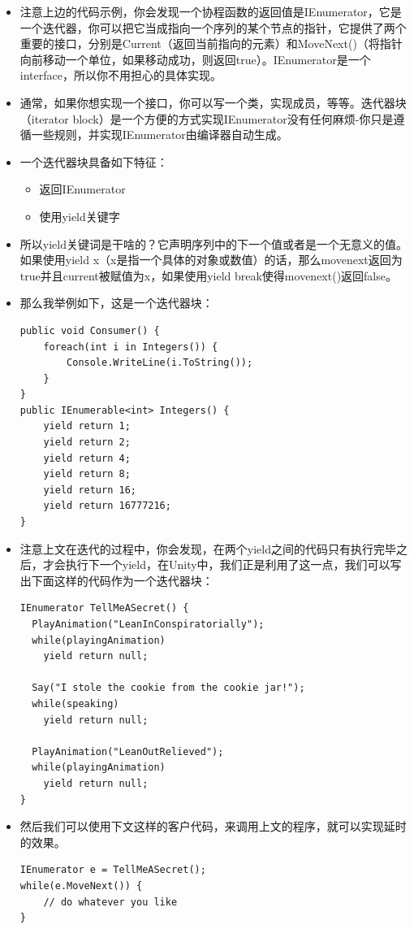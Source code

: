 \documentclass[9pt, b5paper]{article}
\begin{document}
\begin{itemize}
\item 注意上边的代码示例，你会发现一个协程函数的返回值是IEnumerator，它是一个迭代器，你可以把它当成指向一个序列的某个节点的指针，它提供了两个重要的接口，分别是Current（返回当前指向的元素）和MoveNext()（将指针向前移动一个单位，如果移动成功，则返回true）。IEnumerator是一个interface，所以你不用担心的具体实现。
\item 通常，如果你想实现一个接口，你可以写一个类，实现成员，等等。迭代器块（iterator block）是一个方便的方式实现IEnumerator没有任何麻烦-你只是遵循一些规则，并实现IEnumerator由编译器自动生成。
\item 一个迭代器块具备如下特征：
\begin{itemize}
\item 返回IEnumerator
\item 使用yield关键字
\end{itemize}
\item 所以yield关键词是干啥的？它声明序列中的下一个值或者是一个无意义的值。如果使用yield x（x是指一个具体的对象或数值）的话，那么movenext返回为true并且current被赋值为x，如果使用yield break使得movenext()返回false。
\item 那么我举例如下，这是一个迭代器块：
\begin{verbatim}
public void Consumer() {
    foreach(int i in Integers()) {    
        Console.WriteLine(i.ToString());
    }
}
public IEnumerable<int> Integers() {
    yield return 1;
    yield return 2;
    yield return 4;
    yield return 8;
    yield return 16;
    yield return 16777216;
}
\end{verbatim}
\item 注意上文在迭代的过程中，你会发现，在两个yield之间的代码只有执行完毕之后，才会执行下一个yield，在Unity中，我们正是利用了这一点，我们可以写出下面这样的代码作为一个迭代器块：
\begin{verbatim}
IEnumerator TellMeASecret() {
  PlayAnimation("LeanInConspiratorially");
  while(playingAnimation)
    yield return null;
 
  Say("I stole the cookie from the cookie jar!");
  while(speaking)
    yield return null;
 
  PlayAnimation("LeanOutRelieved");
  while(playingAnimation)
    yield return null;
}
\end{verbatim}
\item 然后我们可以使用下文这样的客户代码，来调用上文的程序，就可以实现延时的效果。
\begin{verbatim}
IEnumerator e = TellMeASecret();
while(e.MoveNext()) { 
    // do whatever you like
}
\end{verbatim}
\end{itemize}
\end{document}
